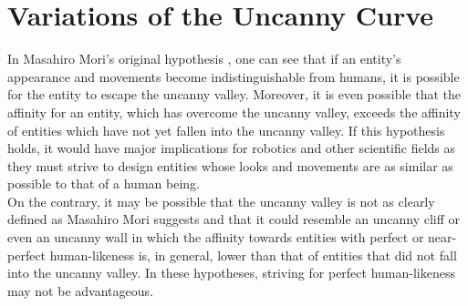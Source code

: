 \chapter{Variations of the Uncanny Curve}
\label{chap:3}
In Masahiro Mori’s original hypothesis \cite{original_masahiro}, one can see that if an entity's appearance and movements become indistinguishable from humans, it is possible for the entity to escape the uncanny valley. Moreover, it is even possible that the affinity for an entity, which has overcome the uncanny valley, exceeds the affinity of entities which have not yet fallen into the uncanny valley. If this hypothesis holds, it would have major implications for robotics and other scientific fields as they must strive to design entities whose looks and movements are as similar as possible to that of a human being.\\
On the contrary, it may be possible that the uncanny valley  is not as clearly defined as Masahiro Mori suggests and that it could resemble an uncanny cliff or even an uncanny wall in which the affinity towards entities with perfect or near-perfect human-likeness is, in general, lower than that of entities that did not fall into the uncanny valley. In these hypotheses, striving for perfect human-likeness may not be advantageous.

